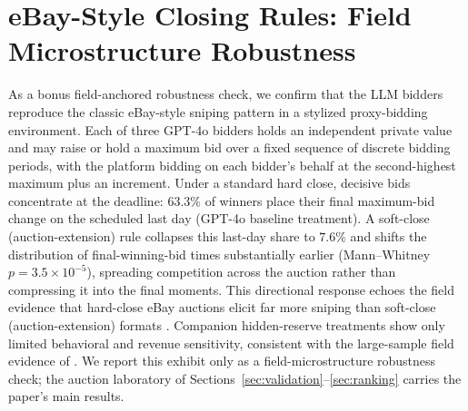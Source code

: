 \section{eBay-Style Closing Rules: Field Microstructure Robustness}\label{app:ebay}

As a bonus field-anchored robustness check, we confirm that the LLM bidders reproduce the classic eBay-style sniping pattern in a stylized proxy-bidding environment. Each of three GPT-4o bidders holds an independent private value and may raise or hold a maximum bid over a fixed sequence of discrete bidding periods, with the platform bidding on each bidder's behalf at the second-highest maximum plus an increment. Under a standard hard close, decisive bids concentrate at the deadline: $63.3\%$ of winners place their final maximum-bid change on the scheduled last day (GPT-4o baseline treatment). A soft-close (auction-extension) rule collapses this last-day share to $7.6\%$ and shifts the distribution of final-winning-bid times substantially earlier (Mann--Whitney $p = 3.5\times10^{-5}$), spreading competition across the auction rather than compressing it into the final moments. This directional response echoes the field evidence that hard-close eBay auctions elicit far more sniping than soft-close (auction-extension) formats \citep{roth2002last,ockenfels2006late}. Companion hidden-reserve treatments show only limited behavioral and revenue sensitivity, consistent with the large-sample field evidence of \citet{einav2011learning}. We report this exhibit only as a field-microstructure robustness check; the auction laboratory of Sections~\ref{sec:validation}--\ref{sec:ranking} carries the paper's main results.

